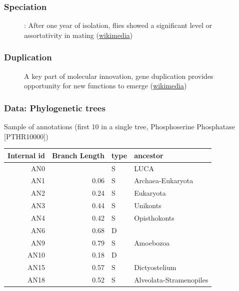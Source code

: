 \documentclass[aspectratio=169, 9pt, handout]{beamer}
\begin{document}
\begin{frame}[label = duplicationvsspeciation]
\frametitle{Speciation}
\begin{figure}
\centering
\def\svgwidth{.8\linewidth}
\tiny

\caption{\cite{Dodd1989}: After one year of isolation, flies showed a significant level or assortativity in mating (\href{https://commons.wikimedia.org/wiki/File:Drosophila_speciation_experiment.svg}{wikimedia})}
\end{figure}

\vfill\hfill \hyperlink{aphylographicalview}{}

\end{frame}

\begin{frame}
\frametitle{Duplication}
\begin{figure}
\centering
\def\svgwidth{.6\linewidth}
\tiny

\caption{A key part of molecular innovation, gene duplication provides opportunity for new functions to emerge (\href{https://en.wikipedia.org/wiki/File:Evolution_fate_duplicate_genes_-_vector.svg}{wikimedia})}
\end{figure}

\vfill\hfill \hyperlink{aphylographicalview}{}

\end{frame}

\begin{frame}[label=phylo-data]
	\frametitle{Data: Phylogenetic trees}
	
	Sample of annotations (first 10 in a single tree, Phosphoserine Phosphatase [PTHR10000])
	
	\small
	
	\begin{table}[ht]
		\centering
		\begin{tabular}{rrll}
			\toprule
			Internal id & Branch Length & type & ancestor \\ 
			\midrule
			AN0 &  & S & LUCA \\ 
			AN1 & 0.06 & S & Archaea-Eukaryota \\ 
			AN2 & 0.24 & S & Eukaryota \\ 
			AN3 & 0.44 & S & Unikonts \\ 
			AN4 & 0.42 & S & Opisthokonts \\ 
			AN6 & 0.68 & D &  \\ 
			AN9 & 0.79 & S & Amoebozoa \\ 
			AN10 & 0.18 & D &  \\ 
			AN15 & 0.57 & S & Dictyostelium \\ 
			AN18 & 0.52 & S & Alveolata-Stramenopiles \\ 
			\bottomrule
		\end{tabular}
	\end{table}
	
\end{frame}
\end{document}
